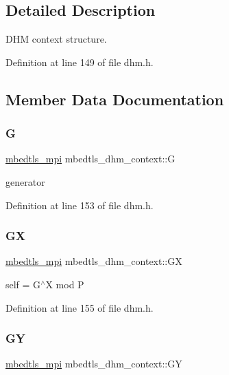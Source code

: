\subsection{Detailed Description}
D\+HM context structure. 

Definition at line 149 of file dhm.\+h.



\subsection{Member Data Documentation}
\mbox{\label{structmbedtls__dhm__context_a4fa0b65bab8ce280ffab2df4285b7ee1}} 
\subsubsection{\texorpdfstring{G}{G}}
{\footnotesize\ttfamily \mbox{\hyperlink{structmbedtls__mpi}{mbedtls\+\_\+mpi}} mbedtls\+\_\+dhm\+\_\+context\+::G}

generator 

Definition at line 153 of file dhm.\+h.

\mbox{\label{structmbedtls__dhm__context_ac33a9d76870e8a807e1d0d9bf77fe85e}} 
\subsubsection{\texorpdfstring{GX}{GX}}
{\footnotesize\ttfamily \mbox{\hyperlink{structmbedtls__mpi}{mbedtls\+\_\+mpi}} mbedtls\+\_\+dhm\+\_\+context\+::\+GX}

self = G$^\wedge$X mod P 

Definition at line 155 of file dhm.\+h.

\mbox{\label{structmbedtls__dhm__context_a834d14fb13ba02b1d604c306d0792bca}} 
\subsubsection{\texorpdfstring{GY}{GY}}
{\footnotesize\ttfamily \mbox{\hyperlink{structmbedtls__mpi}{mbedtls\+\_\+mpi}} mbedtls\+\_\+dhm\+\_\+context\+::\+GY}

